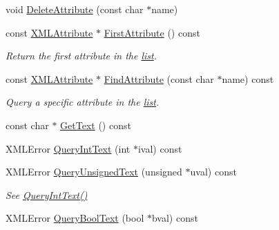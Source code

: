 \begin{DoxyCompactItemize}
void \hyperlink{classtinyxml2_1_1XMLElement_aebd45aa7118964c30b32fe12e944628a}{Delete\+Attribute} (const char $\ast$name)
\item 
\mbox{\label{classtinyxml2_1_1XMLElement_a3e191704c8d499906ec11fe2f60c6686}} 
const \hyperlink{classtinyxml2_1_1XMLAttribute}{X\+M\+L\+Attribute} $\ast$ \hyperlink{classtinyxml2_1_1XMLElement_a3e191704c8d499906ec11fe2f60c6686}{First\+Attribute} () const
\begin{DoxyCompactList}\small\item\em Return the first attribute in the \hyperlink{protocollist-p}{list}. \end{DoxyCompactList}\item 
\mbox{\label{classtinyxml2_1_1XMLElement_a157750dac8037a316fd1af1a973dfa2c}} 
const \hyperlink{classtinyxml2_1_1XMLAttribute}{X\+M\+L\+Attribute} $\ast$ \hyperlink{classtinyxml2_1_1XMLElement_a157750dac8037a316fd1af1a973dfa2c}{Find\+Attribute} (const char $\ast$name) const
\begin{DoxyCompactList}\small\item\em Query a specific attribute in the \hyperlink{protocollist-p}{list}. \end{DoxyCompactList}\item 
const char $\ast$ \hyperlink{classtinyxml2_1_1XMLElement_a0fa5bea0a4daf3ddd503dcabb823eba6}{Get\+Text} () const
\item 
X\+M\+L\+Error \hyperlink{classtinyxml2_1_1XMLElement_a926357996bef633cb736e1a558419632}{Query\+Int\+Text} (int $\ast$ival) const
\item 
\mbox{\label{classtinyxml2_1_1XMLElement_a14d38aa4b5e18a46274a27425188a6a1}} 
X\+M\+L\+Error \hyperlink{classtinyxml2_1_1XMLElement_a14d38aa4b5e18a46274a27425188a6a1}{Query\+Unsigned\+Text} (unsigned $\ast$uval) const
\begin{DoxyCompactList}\small\item\em See \hyperlink{classtinyxml2_1_1XMLElement_a926357996bef633cb736e1a558419632}{Query\+Int\+Text()} \end{DoxyCompactList}\item 
\mbox{\label{classtinyxml2_1_1XMLElement_a3fe5417d59eb8f5c4afe924b7d332736}} 
X\+M\+L\+Error \hyperlink{classtinyxml2_1_1XMLElement_a3fe5417d59eb8f5c4afe924b7d332736}{Query\+Bool\+Text} (bool $\ast$bval) const

\end{DoxyCompactItemize}
